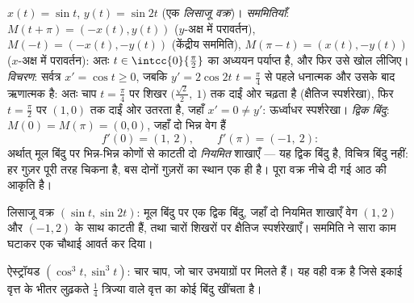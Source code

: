 \begin{example}[आठ की आकृति, पूरा अध्ययन]
\label{ex:b1:curves:lissajous}
$x(t) = \sin t$, $y(t) = \sin 2t$ (एक \emph{लिसाजू वक्र})। \emph{सममितियाँ}:
$M(t + \pi) = (-x(t), y(t))$ ($y$-अक्ष में परावर्तन), $M(-t) = (-x(t),
-y(t))$ (केंद्रीय सममिति), $M(\pi - t) = (x(t), -y(t))$ ($x$-अक्ष में
परावर्तन): अतः $t \in \intcc{0}{\frac\pi2}$ का अध्ययन पर्याप्त है, और फिर
उसे खोल लीजिए। \emph{विचरण}: सर्वत्र $x' = \cos t \geq 0$, जबकि $y' = 2\cos
2t$ $t = \frac\pi4$ से पहले धनात्मक और उसके बाद ऋणात्मक है: अतः चाप $t =
\frac\pi4$ पर शिखर $\bigl(\frac{\sqrt2}2,\ 1\bigr)$ तक दाईं ओर चढ़ता है
(क्षैतिज स्पर्शरेखा), फिर $t = \frac\pi2$ पर $(1, 0)$ तक दाईं ओर उतरता है,
जहाँ $x' = 0 \neq y'$: ऊर्ध्वाधर स्पर्शरेखा। \emph{द्विक बिंदु}: $M(0) =
M(\pi) = (0,0)$, जहाँ दो भिन्न वेग हैं
\[
f'(0) = (1,\ 2), \qquad f'(\pi) = (-1,\ 2) :
\]
अर्थात् मूल बिंदु पर भिन्न-भिन्न कोणों से काटती दो \emph{नियमित} शाखाएँ ---
यह द्विक बिंदु है, विचित्र बिंदु नहीं: हर गुज़र पूरी तरह चिकना है, बस दोनों
गुज़रों का स्थान एक ही है। पूरा वक्र नीचे दी गई आठ की आकृति है।
\end{example}

\begin{omfigure}

{\small लिसाजू वक्र $(\sin t, \sin 2t)$: मूल बिंदु पर एक द्विक बिंदु, जहाँ
दो नियमित शाखाएँ वेग $(1, 2)$ और $(-1, 2)$ के साथ काटती हैं, तथा चारों
शिखरों पर क्षैतिज स्पर्शरेखाएँ। सममिति ने सारा काम घटाकर एक चौथाई आवर्त कर
दिया।}
\end{omfigure}

\begin{omfigure}

{\small ऐस्ट्रॉयड $(\cos^3 t, \sin^3 t)$: चार चाप, जो चार उभयाग्रों पर मिलते
हैं। यह वही वक्र है जिसे इकाई वृत्त के भीतर लुढ़कते $\frac14$ त्रिज्या वाले
वृत्त का कोई बिंदु खींचता है।}
\end{omfigure}


